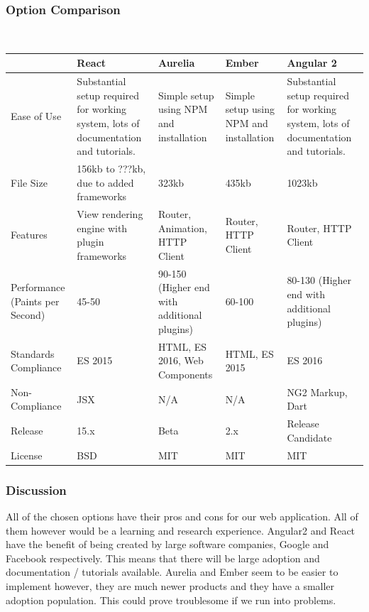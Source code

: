 \documentclass[onecolumn, draftclsnofoot,10pt, compsoc]{IEEEtran}
\begin{document}
{\newpage
\subsubsection{Option Comparison} ~\\

\tablehead{}
\begin{supertabular}{|p{2.5cm}|p{3.3cm}|p{3.3cm}|p{3.3cm}|p{3.3cm}|}
\hline 
	\cite{Eisenberg} 
	& React 
	& Aurelia  
	& Ember  
	& Angular 2 \\ 
\hline
	Ease of Use 
	& Substantial setup required for working system, lots of documentation and tutorials. 
	& Simple setup using NPM and installation     
	& Simple setup using NPM and installation 
	& Substantial setup required for working system, lots of documentation and tutorials. \\ 
\hline
	File Size 
	& 156kb to ???kb, due to added frameworks 
	& 323kb & 435kb                                   
	& 1023kb \\ 
\hline
	Features 
	& View rendering engine with plugin frameworks 
	& Router, Animation, HTTP Client & Router, HTTP Client 
	& Router, HTTP Client \\ 
\hline
	Performance (Paints \hspace{3em} per Second) 
	& 45-50 & 90-150 (Higher end with additional plugins) 
	& 60-100 & 80-130 (Higher end with additional plugins) \\ 
\hline
	Standards \hspace{3em} Compliance 
	& ES 2015 
	& HTML, ES 2016, Web Components 
	& HTML, ES 2015                           
	& ES 2016\\ 
\hline
	Non-Compliance 
	& JSX 
	& N/A 
	& N/A 
	& NG2 Markup, Dart \\ 
\hline
	Release 
	& 15.x 
	& Beta 
	& 2.x  
	& Release Candidate \\ 
\hline
	License 
	& BSD 
	& MIT 
	& MIT 
	& MIT \\ 
\hline
\end{supertabular}

\medskip

\subsubsection{Discussion} 
\noindent All of the chosen options have their pros and cons for our web application. All of them however would be a learning and research experience. Angular2 and React have the benefit of being created by large software companies, Google and Facebook respectively. This means that there will be large adoption and documentation / tutorials available. Aurelia and Ember seem to be easier to implement however, they are much newer products and they have a smaller adoption population. This could prove troublesome if we run into problems. 

}
\end{document}
